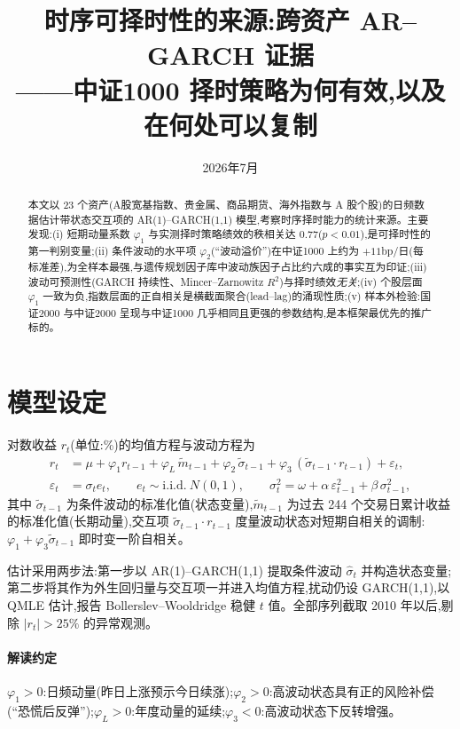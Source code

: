 \documentclass[11pt,a4paper,fontset=mac]{ctexart}
\title{\textbf{时序可择时性的来源:跨资产 AR--GARCH 证据}\\
\large ——中证1000 择时策略为何有效,以及在何处可以复制}
\author{}
\date{2026年7月}
\begin{document}
\maketitle
\vspace{-2.5em}
\begin{abstract}
\noindent 本文以 23 个资产(A股宽基指数、贵金属、商品期货、海外指数与 A 股个股)的日频数据估计带状态交互项的 AR(1)--GARCH(1,1) 模型,考察时序择时能力的统计来源。主要发现:(i) 短期动量系数 $\varphi_1$ 与实测择时策略绩效的秩相关达 $0.77$($p<0.01$),是可择时性的第一判别变量;(ii) 条件波动的水平项 $\varphi_2$(``波动溢价'')在中证1000 上约为 $+11$bp/日(每标准差),为全样本最强,与遗传规划因子库中波动族因子占比约六成的事实互为印证;(iii) 波动可预测性(GARCH 持续性、Mincer--Zarnowitz $R^2$)与择时绩效\emph{无关};(iv) 个股层面 $\varphi_1$ 一致为负,指数层面的正自相关是横截面聚合(lead--lag)的涌现性质;(v) 样本外检验:国证2000 与中证2000 呈现与中证1000 几乎相同且更强的参数结构,是本框架最优先的推广标的。
\end{abstract}

\section{模型设定}
对数收益 $r_t$(单位:\%)的均值方程与波动方程为
\begin{align}
r_t &= \mu + \varphi_1 r_{t-1} + \varphi_L\, \tilde m_{t-1} + \varphi_2\, \tilde\sigma_{t-1} + \varphi_3\,(\tilde\sigma_{t-1}\cdot r_{t-1}) + \varepsilon_t, \\
\varepsilon_t &= \sigma_t e_t,\qquad e_t \sim \mathrm{i.i.d.}\ N(0,1),\qquad
\sigma_t^2 = \omega + \alpha\,\varepsilon_{t-1}^2 + \beta\,\sigma_{t-1}^2,
\end{align}
其中 $\tilde\sigma_{t-1}$ 为条件波动的标准化值(状态变量),$\tilde m_{t-1}$ 为过去 244 个交易日累计收益的标准化值(长期动量),交互项 $\tilde\sigma_{t-1}\cdot r_{t-1}$ 度量波动状态对短期自相关的调制:$\varphi_1 + \varphi_3\tilde\sigma_{t-1}$ 即时变一阶自相关。

估计采用两步法:第一步以 AR(1)--GARCH(1,1) 提取条件波动 $\hat\sigma_t$ 并构造状态变量;第二步将其作为外生回归量与交互项一并进入均值方程,扰动仍设 GARCH(1,1),以 QMLE 估计,报告 Bollerslev--Wooldridge 稳健 $t$ 值。全部序列截取 2010 年以后,剔除 $|r_t|>25\%$ 的异常观测。

\paragraph{解读约定}$\varphi_1>0$:日频动量(昨日上涨预示今日续涨);$\varphi_2>0$:高波动状态具有正的风险补偿(``恐慌后反弹'');$\varphi_L>0$:年度动量的延续;$\varphi_3<0$:高波动状态下反转增强。
\end{document}
